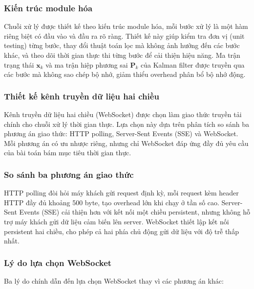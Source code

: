 \subsubsection{Kiến trúc module hóa}

\hspace{0.5cm} Chuỗi xử lý được thiết kế theo kiến trúc module hóa, mỗi bước xử lý là một hàm riêng biệt có đầu vào và đầu ra rõ ràng. Thiết kế này giúp kiểm tra đơn vị (unit testing) từng bước, thay đổi thuật toán lọc mà không ảnh hưởng đến các bước khác, và theo dõi thời gian thực thi từng bước để cải thiện hiệu năng. Ma trận trạng thái $\mathbf{x}_k$ và ma trận hiệp phương sai $\mathbf{P}_k$ của Kalman filter được truyền qua các bước mà không sao chép bộ nhớ, giảm thiểu overhead phân bổ bộ nhớ động.

\subsubsection{Thiết kế kênh truyền dữ liệu hai chiều}

\hspace{0.5cm} Kênh truyền dữ liệu hai chiều (WebSocket) được chọn làm giao thức truyền tải chính cho chuỗi xử lý thời gian thực. Lựa chọn này dựa trên phân tích so sánh ba phương án giao thức: HTTP polling, Server-Sent Events (SSE) và WebSocket. Mỗi phương án có ưu nhược riêng, nhưng chỉ WebSocket đáp ứng đầy đủ yêu cầu của bài toán bám mục tiêu thời gian thực.

\subsubsection{So sánh ba phương án giao thức}

\hspace{0.5cm} HTTP polling đòi hỏi máy khách gửi request định kỳ, mỗi request kèm header HTTP đầy đủ khoảng 500 byte, tạo overhead lớn khi chạy ở tần số cao. Server-Sent Events (SSE) cải thiện hơn với kết nối một chiều persistent, nhưng không hỗ trợ máy khách gửi dữ liệu cảm biến lên server. WebSocket thiết lập kết nối persistent hai chiều, cho phép cả hai phía chủ động gửi dữ liệu với độ trễ thấp nhất.

\subsubsection{Lý do lựa chọn WebSocket}

\hspace{0.5cm} Ba lý do chính dẫn đến lựa chọn WebSocket thay vì các phương án khác:

